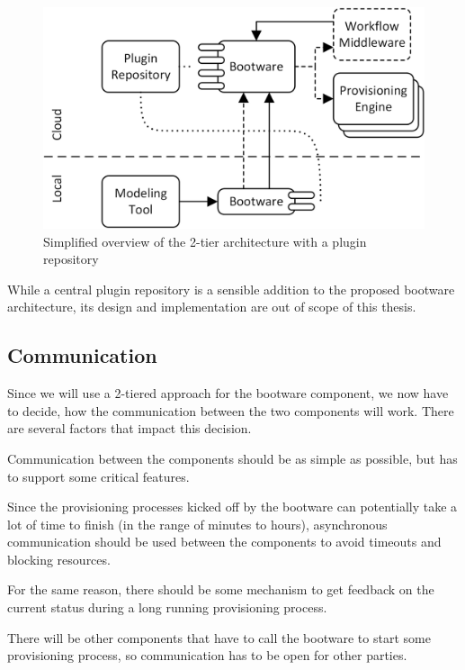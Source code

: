 \begin{figure}[!htbp]
	\centering
	\includegraphics[resolution=600]{design/assets/simple_plugin_repository}
	\caption{Simplified overview of the 2-tier architecture with a plugin repository}
	\label{image:plugin_repository}
\end{figure}

While a central plugin repository is a sensible addition to the proposed bootware architecture, its design and implementation are out of scope of this thesis.

\subsection{Communication}
\label{design:communication}

Since we will use a 2-tiered approach for the bootware component, we now have to decide, how the communication between the two components will work.
There are several factors that impact this decision.

Communication between the components should be as simple as possible, but has to support some critical features.

Since the provisioning processes kicked off by the bootware can potentially take a lot of time to finish (in the range of minutes to hours), asynchronous communication should be used between the components to avoid timeouts and blocking resources.

For the same reason, there should be some mechanism to get feedback on the current status during a long running provisioning process.

There will be other components that have to call the bootware to start some provisioning process, so communication has to be open for other parties.

